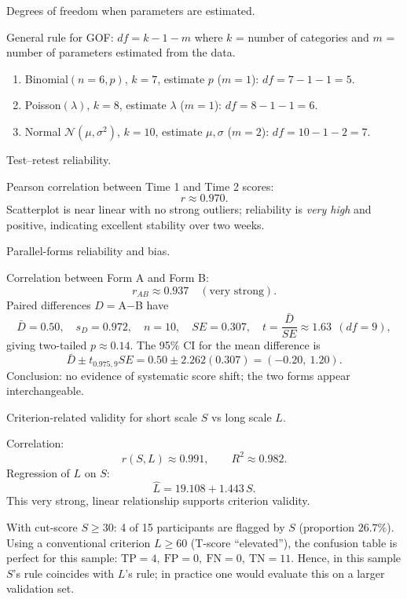 \documentclass[11pt]{article}
\def\textbf#1{#1}%
\def\mathrm#1{#1}%
\begin{document}
\begin{solution}
\textbf{Degrees of freedom when parameters are estimated.}

General rule for GOF: $\mathrm{df}=k-1-m$ where $k$ = number of categories and $m$ = number of parameters estimated from the data.

\begin{enumerate}
  \item Binomial$(n=6,p)$, $k=7$, estimate $p$ ($m=1$): $\mathrm{df}=7-1-1=\boxed{5}$.
  \item Poisson$(\lambda)$, $k=8$, estimate $\lambda$ ($m=1$): $\mathrm{df}=8-1-1=\boxed{6}$.
  \item Normal $\mathcal N(\mu,\sigma^2)$, $k=10$, estimate $\mu,\sigma$ ($m=2$): $\mathrm{df}=10-1-2=\boxed{7}$.
\end{enumerate}
\end{solution}

\begin{solution}
\textbf{Test–retest reliability.}

Pearson correlation between Time 1 and Time 2 scores:
\[
r\approx \boxed{0.970}.
\]
Scatterplot is near linear with no strong outliers; reliability is \emph{very high} and positive, indicating excellent stability over two weeks.
\end{solution}

\begin{solution}
\textbf{Parallel-forms reliability and bias.}

Correlation between Form A and Form B:
\[
r_{AB}\approx \boxed{0.937}\quad(\text{very strong}).
\]
Paired differences $D=$A$-$B have
\[
\bar D=0.50,\quad s_D=0.972,\quad n=10,\quad \mathrm{SE}=0.307,\quad
t=\frac{\bar D}{\mathrm{SE}}\approx 1.63\ \ (\mathrm{df}=9),
\]
giving two-tailed $p\approx \boxed{0.14}$. The 95\% CI for the mean difference is
\[
\bar D \pm t_{0.975,9}\mathrm{SE}=0.50\pm 2.262(0.307)=\boxed{(-0.20,\ 1.20)}.
\]
Conclusion: no evidence of systematic score shift; the two forms appear interchangeable.
\end{solution}

\begin{solution}
\textbf{Criterion‐related validity for short scale $S$ vs long scale $L$.}

Correlation:
\[
r(S,L)\approx \boxed{0.991},\qquad R^2\approx 0.982.
\]
Regression of $L$ on $S$:
\[
\widehat{L}= \boxed{19.108 + 1.443\,S}.
\]
This very strong, linear relationship supports criterion validity.

With cut‐score $S\ge 30$:
4 of 15 participants are flagged by $S$ (proportion $\boxed{26.7\%}$).
Using a conventional criterion $L\ge 60$ (T-score “elevated”),
the confusion table is perfect for this sample:
$\text{TP}=4,\ \text{FP}=0,\ \text{FN}=0,\ \text{TN}=11$.
Hence, in this sample $S$’s rule coincides with $L$’s rule; in practice one would evaluate this on a larger validation set.
\end{solution}
\end{document}
